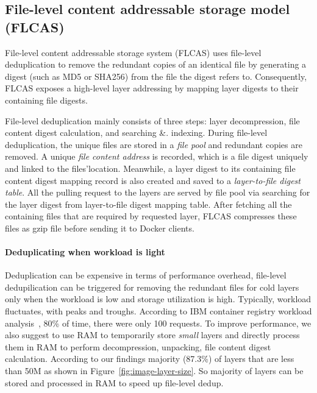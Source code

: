 \subsection{File-level content addressable storage model (FLCAS)}
File-level content addressable storage system (FLCAS) uses file-level deduplication to remove the redundant copies of an identical file by generating a digest (such as MD5 or SHA256) from the file the digest refers to. 
Consequently,
FLCAS exposes a high-level layer addressing by mapping layer digests to their
containing file digests. 

File-level deduplication mainly consists of three
steps: layer decompression, file content digest calculation, and searching \&.
indexing.  
During file-level deduplication, the unique files are stored in a
\textit{file pool} and redundant copies are removed. A unique \textit{file
content address} is recorded, which is a file digest uniquely and linked to the
files'location. Meanwhile, a layer digest to its containing file content digest
mapping record is also created and saved to a \textit{layer-to-file digest
table}.  All the pulling request to the layers are served by file pool via
searching for the layer digest from layer-to-file digest mapping table. After
fetching all the containing files that are required by requested layer, FLCAS
compresses these files as gzip file before sending it to Docker clients.         

\paragraph{Deduplicating when workload is light}
Deduplication can be expensive in terms of performance overhead, file-level
dedupilication can be triggered for removing the redundant files for cold
layers only when the workload is low and storage utilization is high.  Typically,
workload fluctuates, with peaks and troughs. According to IBM container
registry workload analysis~\cite{xxx}, 80\% of time, there were only 100
requests.
To improve performance, we also suggest to use
RAM to temporarily store \textit{small} layers and directly process them in RAM
to perform decompression, unpacking, file content digest calculation.
According to our findings majority (87.3\%) of layers that are less than 50M as
shown in Figure~\ref{fig:image-layer-size}. So majority of layers can be stored
and processed in RAM to speed up file-level dedup. 

